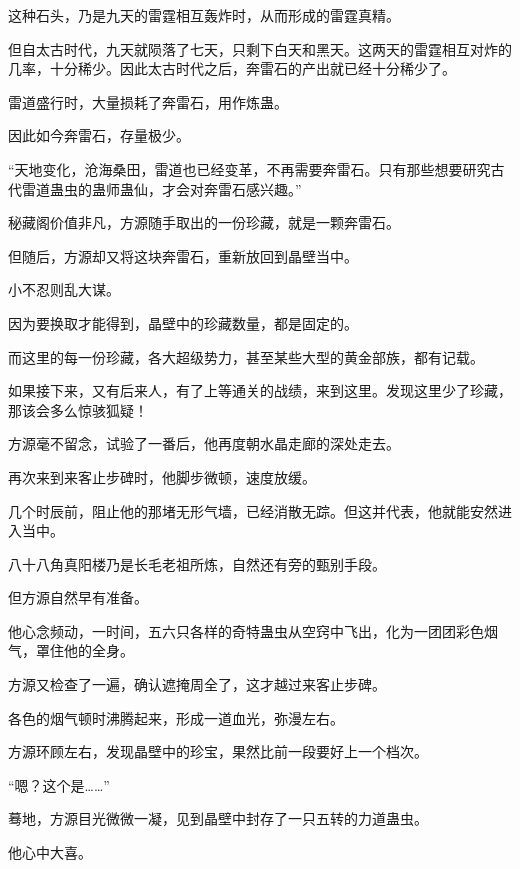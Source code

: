 \begin{this_body}
这种石头，乃是九天的雷霆相互轰炸时，从而形成的雷霆真精。

但自太古时代，九天就陨落了七天，只剩下白天和黑天。这两天的雷霆相互对炸的几率，十分稀少。因此太古时代之后，奔雷石的产出就已经十分稀少了。

雷道盛行时，大量损耗了奔雷石，用作炼蛊。

因此如今奔雷石，存量极少。

“天地变化，沧海桑田，雷道也已经变革，不再需要奔雷石。只有那些想要研究古代雷道蛊虫的蛊师蛊仙，才会对奔雷石感兴趣。”

秘藏阁价值非凡，方源随手取出的一份珍藏，就是一颗奔雷石。

但随后，方源却又将这块奔雷石，重新放回到晶壁当中。

小不忍则乱大谋。

因为要换取才能得到，晶壁中的珍藏数量，都是固定的。

而这里的每一份珍藏，各大超级势力，甚至某些大型的黄金部族，都有记载。

如果接下来，又有后来人，有了上等通关的战绩，来到这里。发现这里少了珍藏，那该会多么惊骇狐疑！

方源毫不留念，试验了一番后，他再度朝水晶走廊的深处走去。

再次来到来客止步碑时，他脚步微顿，速度放缓。

几个时辰前，阻止他的那堵无形气墙，已经消散无踪。但这并代表，他就能安然进入当中。

八十八角真阳楼乃是长毛老祖所炼，自然还有旁的甄别手段。

但方源自然早有准备。

他心念频动，一时间，五六只各样的奇特蛊虫从空窍中飞出，化为一团团彩色烟气，罩住他的全身。

方源又检查了一遍，确认遮掩周全了，这才越过来客止步碑。

各色的烟气顿时沸腾起来，形成一道血光，弥漫左右。

方源环顾左右，发现晶壁中的珍宝，果然比前一段要好上一个档次。

“嗯？这个是……”

蓦地，方源目光微微一凝，见到晶壁中封存了一只五转的力道蛊虫。

他心中大喜。

\end{this_body}

